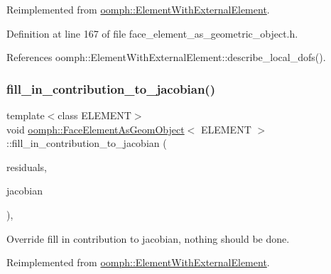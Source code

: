 Reimplemented from \hyperlink{classoomph_1_1ElementWithExternalElement_a2a1753bed2e822d399aa3525f1bdac4b}{oomph\+::\+Element\+With\+External\+Element}.



Definition at line 167 of file face\+\_\+element\+\_\+as\+\_\+geometric\+\_\+object.\+h.



References oomph\+::\+Element\+With\+External\+Element\+::describe\+\_\+local\+\_\+dofs().

\mbox{\label{classoomph_1_1FaceElementAsGeomObject_a2835ee6ef417ec603c39a1f0f4e356f0}} 
\subsubsection{\texorpdfstring{fill\+\_\+in\+\_\+contribution\+\_\+to\+\_\+jacobian()}{fill\_in\_contribution\_to\_jacobian()}}
{\footnotesize\ttfamily template$<$class E\+L\+E\+M\+E\+NT$>$ \\
void \hyperlink{classoomph_1_1FaceElementAsGeomObject}{oomph\+::\+Face\+Element\+As\+Geom\+Object}$<$ E\+L\+E\+M\+E\+NT $>$\+::fill\+\_\+in\+\_\+contribution\+\_\+to\+\_\+jacobian (\begin{DoxyParamCaption}\item[{\hyperlink{classoomph_1_1Vector}{Vector}$<$ double $>$ \&}]{residuals,  }\item[{\hyperlink{classoomph_1_1DenseMatrix}{Dense\+Matrix}$<$ double $>$ \&}]{jacobian }\end{DoxyParamCaption})\hspace{0.3cm}{\ttfamily [inline]}, {\ttfamily [virtual]}}



Override fill in contribution to jacobian, nothing should be done. 



Reimplemented from \hyperlink{classoomph_1_1ElementWithExternalElement_ae5fb09552a8271e891438f8d058ca1b8}{oomph\+::\+Element\+With\+External\+Element}.



